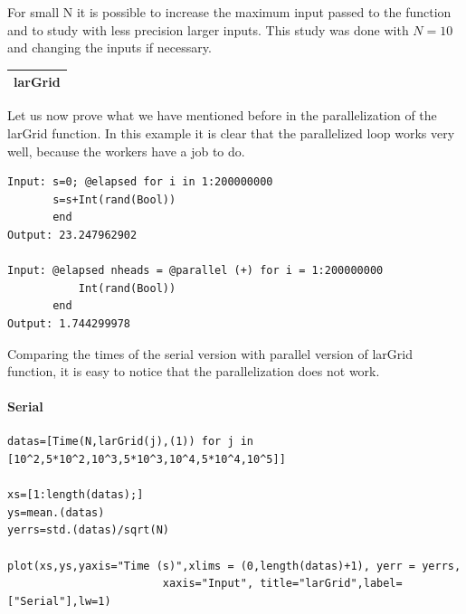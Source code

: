 \documentclass{article}
\begin{document}
For small N it is possible to increase the maximum input passed to the function and to study with less precision larger inputs.
This study was done with $N = 10$ and changing the inputs if necessary.
\vspace{2ex}
\begin{center}
\begin{tabular}{p{16cm}}
\hline
larGrid\\
\hline
\end{tabular}
\end{center}
\vspace{1ex}
Let us now prove what we have mentioned before in the parallelization of the larGrid function.
In this example it is clear that the parallelized loop works very well, because the workers have a job to do.
\begin{flushleft}\small
\begin{list}{}{} \item
   \begin{Verbatim}[tabsize=4]
Input: s=0; @elapsed for i in 1:200000000
       s=s+Int(rand(Bool))
       end
Output: 23.247962902

Input: @elapsed nheads = @parallel (+) for i = 1:200000000
           Int(rand(Bool))
       end
Output: 1.744299978
\end{Verbatim}
\end{list}
\end{flushleft}
Comparing the times of the serial version with parallel version of larGrid function, it is easy to notice that the parallelization does not work.
\vspace{2ex}
\paragraph{Serial}
\begin{flushleft}\small
\begin{list}{}{} \item
    \begin{Verbatim}[tabsize=4]
datas=[Time(N,larGrid(j),(1)) for j in [10^2,5*10^2,10^3,5*10^3,10^4,5*10^4,10^5]]

xs=[1:length(datas);]
ys=mean.(datas)
yerrs=std.(datas)/sqrt(N)

plot(xs,ys,yaxis="Time (s)",xlims = (0,length(datas)+1), yerr = yerrs,
                        xaxis="Input", title="larGrid",label=["Serial"],lw=1)
    \end{Verbatim}
\end{list}
\end{flushleft} 
\end{document}
